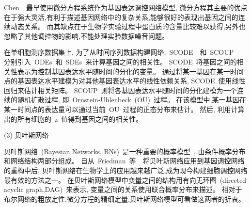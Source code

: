 Chen~\cite{chen1999modeling}~最早使用微分方程系统作为基因表达调控网络模型,
微分方程其主要的优点在于强大灵活,有利于描述基因网络中的复杂关系,能够很好的表现出基因之间的连续动态关系。
而其缺点在于生物学实验过程中蛋白质的含量比较难以获得,另外也忽略了其他调控物的影响,不能处理实验数据噪音问题。

在单细胞测序数据集上, 
为了从时间序列数据构建网络,~SCODE~\cite{matsumoto2017scode}~和~SCOUP~\cite{matsumoto2016scoup}~
分别引入~ODEs~和~SDEs~来计算基因之间的相关性。
SCODE~将基因之间的相关性表示为控制基因表达水平随时间的分化的变量。
通过将某一基因在某一时间点的基因表达水平建模为对其他基因表达水平的线性依赖关系,
SCODE~使用线性回归来估计相关矩阵。
SCOUP~则将各基因表达水平随时间的分化建模为一个连续的随机扩散过程, 即~Ornstein-Uhlenbeck~(OU)~过程。
在该模型中,某一基因在某一时间点的表达量可以通过当前~OU~过程的正态分布来估计。
然后, 利用计算出的所有细胞的~z~值得到基因之间的相关性。

(3) 贝叶斯网络

贝叶斯网络~(Bayesian Networks, BNs)~是一种重要的概率模型~\cite{kim2003inferring,zou2004new,chen2006effective,needham2007primer,lo2015high},
由条件概率分布和网络结构两部分组成。
自从~Friedman~等~\cite{friedman2000using}~将贝叶斯网络应用到基因调控网络的重构中后,
贝叶斯网络在生物学上的应用越来越广泛,成为现今构建细胞调控网络最有效的方法之一。
在贝叶斯网络模型中变量之间的结构用有向无环图~(directed acyclic graph,DAG)~来表示,
变量之间的关系使用联合概率分布来描述。
相对于布尔网络的粗放定性,微分方程的精细定量,贝叶斯网络模型可看做这两者的折衷。

